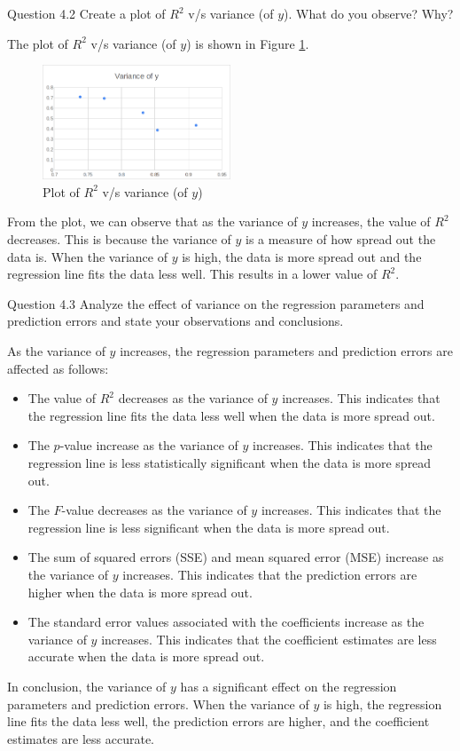 \begin{custombox}[label={box:Q4.2}]{Question 4.2}
	Create a plot of $R^2$ v/s variance (of $y$). What do you observe? Why?
\end{custombox}

The plot of $R^2$ v/s variance (of $y$) is shown in Figure \ref{fig:Q4.2}.

\begin{figure}[H]
	\centering
	\includegraphics[width=0.5\textwidth]{Images/Q4_2.png}
	\caption{Plot of $R^2$ v/s variance (of $y$)}
	\label{fig:Q4.2}
\end{figure}

From the plot, we can observe that as the variance of $y$ increases, the value of $R^2$ decreases. This is because the variance of $y$ is a measure of how spread out the data is. When the variance of $y$ is high, the data is more spread out and the regression line fits the data less well. This results in a lower value of $R^2$.

\vspace{10mm}

\begin{custombox}[label={box:Q4.3}]{Question 4.3}
	Analyze the effect of variance on the regression parameters and prediction errors and state your observations and conclusions.
\end{custombox}

As the variance of $y$ increases, the regression parameters and prediction errors are affected as follows:

\begin{itemize}
	\item The value of $R^2$ decreases as the variance of $y$ increases. This indicates that the regression line fits the data less well when the data is more spread out.
	\item The $p$-value increase as the variance of $y$ increases. This indicates that the regression line is less statistically significant when the data is more spread out.
	\item The $F$-value decreases as the variance of $y$ increases. This indicates that the regression line is less significant when the data is more spread out.
	\item The sum of squared errors (SSE) and mean squared error (MSE) increase as the variance of $y$ increases. This indicates that the prediction errors are higher when the data is more spread out.
	\item The standard error values associated with the coefficients increase as the variance of $y$ increases. This indicates that the coefficient estimates are less accurate when the data is more spread out.
\end{itemize}

In conclusion, the variance of $y$ has a significant effect on the regression parameters and prediction errors. When the variance of $y$ is high, the regression line fits the data less well, the prediction errors are higher, and the coefficient estimates are less accurate.




